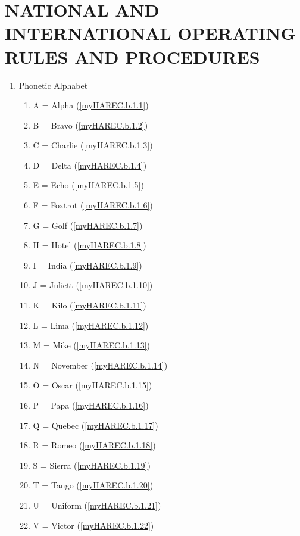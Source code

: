 \section{NATIONAL AND INTERNATIONAL OPERATING RULES AND PROCEDURES}

\begin{enumerate}[noitemsep]
\item Phonetic Alphabet
\begin{enumerate}[noitemsep]
\item A = Alpha (\ref{myHAREC.b.1.1})\label{HAREC.b.1.1}
\item B = Bravo (\ref{myHAREC.b.1.2})\label{HAREC.b.1.2}
\item C = Charlie (\ref{myHAREC.b.1.3})\label{HAREC.b.1.3}
\item D = Delta (\ref{myHAREC.b.1.4})\label{HAREC.b.1.4}
\item E = Echo (\ref{myHAREC.b.1.5})\label{HAREC.b.1.5}
\item F = Foxtrot (\ref{myHAREC.b.1.6})\label{HAREC.b.1.6}
\item G = Golf (\ref{myHAREC.b.1.7})\label{HAREC.b.1.7}
\item H = Hotel (\ref{myHAREC.b.1.8})\label{HAREC.b.1.8}
\item I = India (\ref{myHAREC.b.1.9})\label{HAREC.b.1.9}
\item J = Juliett (\ref{myHAREC.b.1.10})\label{HAREC.b.1.10}
\item K = Kilo (\ref{myHAREC.b.1.11})\label{HAREC.b.1.11}
\item L = Lima (\ref{myHAREC.b.1.12})\label{HAREC.b.1.12}
\item M = Mike (\ref{myHAREC.b.1.13})\label{HAREC.b.1.13}
\item N = November (\ref{myHAREC.b.1.14})\label{HAREC.b.1.14}
\item O = Oscar (\ref{myHAREC.b.1.15})\label{HAREC.b.1.15}
\item P = Papa (\ref{myHAREC.b.1.16})\label{HAREC.b.1.16}
\item Q = Quebec (\ref{myHAREC.b.1.17})\label{HAREC.b.1.17}
\item R = Romeo (\ref{myHAREC.b.1.18})\label{HAREC.b.1.18}
\item S = Sierra (\ref{myHAREC.b.1.19})\label{HAREC.b.1.19}
\item T = Tango (\ref{myHAREC.b.1.20})\label{HAREC.b.1.20}
\item U = Uniform (\ref{myHAREC.b.1.21})\label{HAREC.b.1.21}
\item V = Victor (\ref{myHAREC.b.1.22})\label{HAREC.b.1.22}

\end{enumerate}
\end{enumerate}

